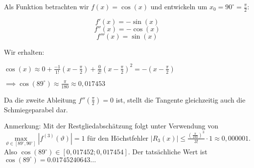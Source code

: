 \item Als Funktion betrachten wir $f(x) = \cos(x)$ und entwickeln um $x_0=90^\circ = \frac{\pi}{2}$:

$$f'(x) = -\sin(x)$$
$$f''(x) = -\cos(x)$$
$$f'''(x) = \sin(x)$$

Wir erhalten:

$\cos(x) \approx 0 + \frac{-1}{1!} (x-\frac{\pi}{2}) + \frac{0}{2!}(x-\frac{\pi}{2})^2 = -(x-\frac{\pi}{2})$

$\implies \cos(89^\circ) \approx \frac{\pi}{180} \approx 0,017453$

Da die zweite Ableitung $f''(\frac{\pi}{2})=0$ ist, stellt die Tangente gleichzeitig auch die Schmiegeparabel dar.

Anmerkung: Mit der Restgliedabschätzung folgt unter Verwendung von $\max\limits_{\vartheta \in [89^\circ,90^\circ]}|f^{(3)}(\vartheta)| = 1$ für den Höchstfehler $|R_3(x)| \leq \frac{(\frac{\pi}{180})^3}{3!}\cdot 1 \approx 0,000001$. Also $\cos(89^\circ) \in [0,017452;0,017454]$. Der tatsächliche Wert ist $\cos(89^\circ) = 0.01745240643...$

